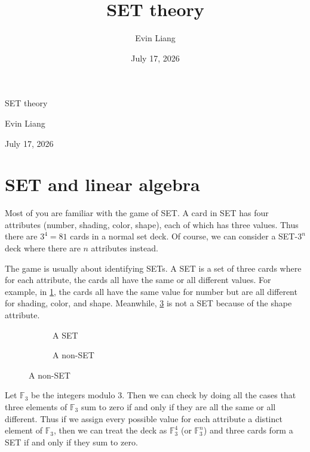 \documentclass{article}
\title{\vspace{-1cm}SET theory}
\author{Evin Liang}
\date{July 17, 2026}
\theoremstyle{definition}
\theoremstyle{remark}
\begin{document}
\begingroup
    \centering
    \vspace*{0cm}
    {\huge SET theory\par}
    \vspace{0.5cm}
    {\large Evin Liang\par}
    \vspace{0.1cm}
    {July 17, 2026\par}
    \vspace*{0.5cm}
\endgroup

\section{SET and linear algebra}
Most of you are familiar with the game of SET. A card in SET has four attributes (number, shading, color, shape), each of which has three values. Thus there are $3^4=81$ cards in a normal set deck. Of course, we can consider a SET-$3^n$ deck where there are $n$ attributes instead.

The game is usually about identifying SETs. A SET is a set of three cards where for each attribute, the cards all have the same or all different values. For example, in \cref{f:set}, the cards all have the same value for number but are all different for shading, color, and shape. Meanwhile, \cref{f:nonset} is not a SET because of the shape attribute.

\begin{figure}[h]
    \centering
    \begin{subfigure}{0.45\textwidth}
        \centering
        \caption{A SET}
        \label{f:set}
    \end{subfigure}
    \hspace*{0\textwidth}
    \begin{subfigure}{0.45\textwidth}
        \centering
        \caption{A non-SET}
        \label{f:nonset}
    \end{subfigure}
\end{figure}

Let $\mathbb F_3$ be the integers modulo 3. Then we can check by doing all the cases that three elements of $\mathbb F_3$ sum to zero if and only if they are all the same or all different. Thus if we assign every possible value for each attribute a distinct element of $\mathbb F_3$, then we can treat the deck as $\mathbb F_3^4$ (or $\mathbb F_3^n$) and three cards form a SET if and only if they sum to zero.
\end{document}
